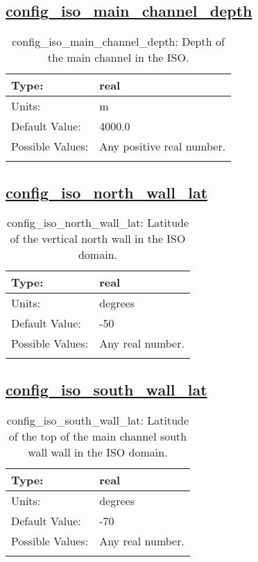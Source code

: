 \subsection[config\_iso\_main\_channel\_depth]{\hyperref[sec:nm_tab_iso]{config\_iso\_main\_channel\_depth}}
\label{subsec:nm_sec_config_iso_main_channel_depth}
\begin{center}
\begin{longtable}{| p{2.0in} || p{4.0in} |}
    \hline
    Type: & real \\
    \hline
    Units: & \si{m} \\
    \hline
    Default Value: & 4000.0 \\
    \hline
    Possible Values: & Any positive real number. \\
    \hline
    \caption{config\_iso\_main\_channel\_depth: Depth of the main channel in the ISO.}
\end{longtable}
\end{center}
\subsection[config\_iso\_north\_wall\_lat]{\hyperref[sec:nm_tab_iso]{config\_iso\_north\_wall\_lat}}
\label{subsec:nm_sec_config_iso_north_wall_lat}
\begin{center}
\begin{longtable}{| p{2.0in} || p{4.0in} |}
    \hline
    Type: & real \\
    \hline
    Units: & \si{degrees} \\
    \hline
    Default Value: & -50 \\
    \hline
    Possible Values: & Any real number. \\
    \hline
    \caption{config\_iso\_north\_wall\_lat: Latitude of the vertical north wall in the ISO domain.}
\end{longtable}
\end{center}
\subsection[config\_iso\_south\_wall\_lat]{\hyperref[sec:nm_tab_iso]{config\_iso\_south\_wall\_lat}}
\label{subsec:nm_sec_config_iso_south_wall_lat}
\begin{center}
\begin{longtable}{| p{2.0in} || p{4.0in} |}
    \hline
    Type: & real \\
    \hline
    Units: & \si{degrees} \\
    \hline
    Default Value: & -70 \\
    \hline
    Possible Values: & Any real number. \\
    \hline
    \caption{config\_iso\_south\_wall\_lat: Latitude of the top of the main channel south wall wall in the ISO domain.}
\end{longtable}
\end{center}
